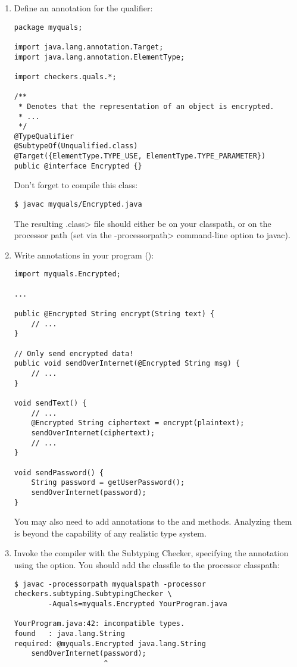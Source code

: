 \begin{enumerate}
\item
 Define an annotation for the  qualifier:

\begin{Verbatim}
package myquals;

import java.lang.annotation.Target;
import java.lang.annotation.ElementType;

import checkers.quals.*;

/**
 * Denotes that the representation of an object is encrypted.
 * ...
 */
@TypeQualifier
@SubtypeOf(Unqualified.class)
@Target({ElementType.TYPE_USE, ElementType.TYPE_PARAMETER})
public @interface Encrypted {}
\end{Verbatim}

Don't forget to compile this class:

\begin{Verbatim}
$ javac myquals/Encrypted.java
\end{Verbatim}

The resulting \<.class> file should either be on your classpath, or on the
processor path (set via the \<-processorpath> command-line option to javac).

\item 
  Write  annotations in your program ():

\begin{Verbatim}
import myquals.Encrypted;

...

public @Encrypted String encrypt(String text) {
    // ...
}

// Only send encrypted data!
public void sendOverInternet(@Encrypted String msg) {
    // ...
}

void sendText() {
    // ...
    @Encrypted String ciphertext = encrypt(plaintext);
    sendOverInternet(ciphertext);
    // ...
}

void sendPassword() {
    String password = getUserPassword();
    sendOverInternet(password);
}
\end{Verbatim}

You may also need to add  annotations to the
 and  methods.  Analyzing them is beyond the
capability of any realistic type system.

\item
  Invoke the compiler with the Subtyping Checker, specifying the
   annotation using the  option.
  You should add the  classfile to the processor classpath:

\begin{Verbatim}
$ javac -processorpath myqualspath -processor checkers.subtyping.SubtypingChecker \
        -Aquals=myquals.Encrypted YourProgram.java

YourProgram.java:42: incompatible types.
found   : java.lang.String
required: @myquals.Encrypted java.lang.String
    sendOverInternet(password);
                     ^
\end{Verbatim}

\end{enumerate}



